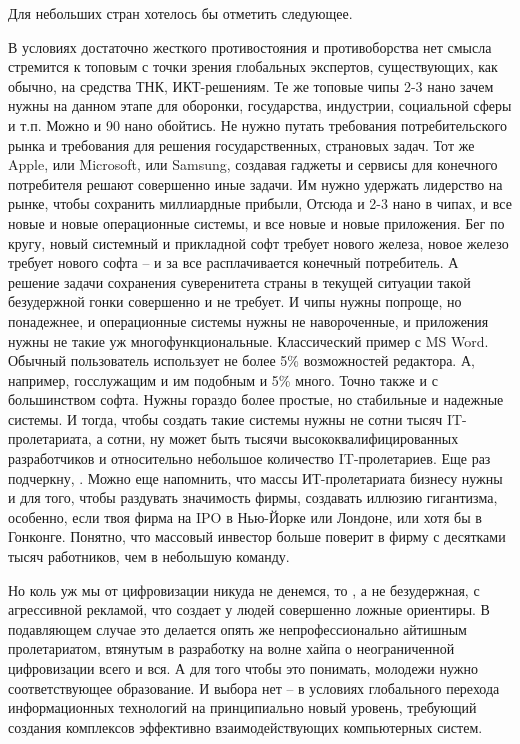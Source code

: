 \begin{partbacktext}
Для небольших стран хотелось бы отметить следующее.

В условиях достаточно жесткого противостояния и противоборства нет смысла стремится к топовым с точки зрения глобальных экспертов, существующих, как обычно, на средства ТНК, ИКТ-решениям. Те же топовые чипы 2-3 нано зачем нужны на данном этапе для оборонки, государства, индустрии, социальной сферы и т.п. Можно и 90 нано обойтись. Не нужно путать требования потребительского рынка и требования для решения государственных, страновых задач. Тот же Apple, или Microsoft, или Samsung, создавая гаджеты и сервисы для конечного потребителя решают совершенно иные задачи. Им нужно удержать лидерство на рынке, чтобы сохранить миллиардные прибыли, Отсюда и 2-3 нано в чипах, и все новые и новые операционные системы, и все новые и новые приложения. Бег по кругу, новый системный и прикладной софт требует нового железа, новое железо требует нового софта -- и за все расплачивается конечный потребитель. А решение задачи сохранения суверенитета страны в текущей ситуации такой безудержной гонки совершенно и не требует. И чипы нужны попроще, но понадежнее, и операционные системы нужны не навороченные, и приложения нужны не такие уж многофункциональные. Классический пример с MS Word. Обычный пользователь использует не более 5\% возможностей редактора. А, например, госслужащим и им подобным и 5\% много. Точно также и с большинством софта. Нужны гораздо более простые, но стабильные и надежные системы. И тогда, чтобы создать такие системы нужны не сотни тысяч IT-пролетариата, а сотни, ну может быть тысячи высококвалифицированных разработчиков и относительно небольшое количество IT-пролетариев. Еще раз подчеркну,   . Можно еще напомнить, что массы ИТ-пролетариата бизнесу нужны и для того, чтобы раздувать значимость фирмы, создавать иллюзию гигантизма, особенно, если твоя фирма на IPO в Нью-Йорке или Лондоне, или хотя бы в Гонконге. Понятно, что массовый инвестор больше поверит в фирму с десятками тысяч работников, чем в небольшую команду.

Но коль уж мы от цифровизации никуда не денемся, то   , а не безудержная, с агрессивной рекламой, что создает у людей совершенно ложные ориентиры. В подавляющем случае это делается опять же непрофессионально айтишным пролетариатом, втянутым в разработку на волне хайпа о неограниченной цифровизации всего и вся. А для того чтобы это понимать, молодежи нужно соответствующее образование. И выбора нет --            в условиях глобального перехода информационных технологий на принципиально новый уровень, требующий создания комплексов эффективно взаимодействующих компьютерных систем.
 

\end{partbacktext}
